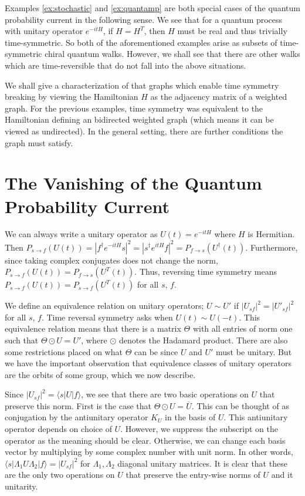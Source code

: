 \documentclass[twocolumn,superscriptaddress]{revtex4-1}
\theoremstyle{plain}
\theoremstyle{definition}
\theoremstyle{definition}
\theoremstyle{definition}
\theoremstyle{definition}
\theoremstyle{definition}
\theoremstyle{definition}
\begin{document}
 Examples \ref{ex:stochastic} and \ref{ex:quantamp} are both special cases of the quantum probability current in the following sense.  We see that for a quantum process with unitary operator $e^{-itH}$, if $H=H^T$, then $H$ must be real and thus trivially time-symmetric. So both of the aforementioned examples arise as subsets of time-symmetric chiral quantum walks. However, we shall see that there are other walks which are time-reversible that do not fall into the above situations.

We shall give a characterization of that graphs which enable time symmetry breaking by viewing the Hamiltonian $H$ as the adjacency matrix of a weighted graph. For the previous examples, time symmetry was equivalent to the Hamiltonian defining an bidirected weighted graph (which means it can be viewed as undirected). In the general setting, there are further conditions the graph must satisfy.

\section{The Vanishing of the Quantum Probability Current}\label{sec:probcurr}

We can always write a unitary operator as $U(t)=e^{-itH}$ where $H$ is Hermitian. Then $P_{s\to f}(U(t))=|f^\dagger e^{-itH} s|^2=|s^\dagger e^{itH} f|^2=P_{f\to s}(U^\dagger(t))$. Furthermore, since taking complex conjugates does not change the norm, $P_{s\to f}(U(t))=P_{f\to s}(U^T(t))$. Thus, reversing time symmetry means $P_{s\to f}(U(t))=P_{s\to f}(U^T(t))$ for all $s$, $f$.


We define an equivalence relation on unitary operators; $U\sim U'$ if $|U_{sf}|^2=|U'_{sf}|^2$ for all $s$, $f$. Time reversal symmetry asks when $U(t)\sim U(-t)$. This equivalence relation means that there is a matrix $\Theta$ with all entries of norm one such that $\Theta\odot U=U'$, where $\odot$ denotes the Hadamard product. There are also some restrictions placed on what $\Theta$ can be since $U$ and $U'$ must be unitary. But we have the important observation that equivalence classes of unitary operators are the orbits of some group, which we now describe.

Since $|U_{sf}|^2=\langle s|U|f\rangle$, we see that there are two basic operations on $U$ that preserve this norm. First is the case that $\Theta\odot U=\overline{U}$. This can be thought of as conjugation by the antiunitary operator $K_U$ in the basis of $U$. This antiunitary operator depends on choice of $U$. However, we suppress the subscript on the operator as the meaning should be clear. Otherwise, we can change each basis vector by multiplying by some complex number with unit norm. In other words, $\langle s|\Lambda_1 U\Lambda_2|f\rangle=|U_{sf}|^2$ for $\Lambda_1,\Lambda_2$ diagonal unitary matrices. It is clear that these are the only two operations on $U$ that preserve the entry-wise norms of $U$ and it unitarity.
\end{document}
